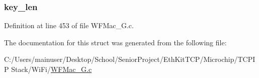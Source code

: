 \subsubsection[{key\+\_\+len}]{ key\+\_\+len}\label{structsec__wpa__psk_a0ea1de94c3f3ce62f43a44576691a3cb}


Definition at line 453 of file W\+F\+Mac\+\_\+G.\+c.



The documentation for this struct was generated from the following file\+:\begin{DoxyCompactItemize}
\item 
C\+:/\+Users/mainuser/\+Desktop/\+School/\+Senior\+Project/\+Eth\+Kit\+T\+C\+P/\+Microchip/\+T\+C\+P\+I\+P Stack/\+Wi\+Fi/\hyperlink{_w_f_mac__24_g_8c}{W\+F\+Mac\+\_\+G.\+c}\end{DoxyCompactItemize}
